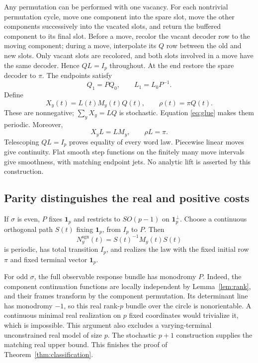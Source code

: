 \documentclass[11pt]{article}
\theoremstyle{definition}\newtheorem{definition}[theorem]{Definition}
\theoremstyle{remark}\newtheorem{remark}[theorem]{Remark}
\newcommand{\one}{\mathbf 1}
\begin{document}
Any permutation can be performed with one vacancy. For each nontrivial permutation cycle, move one component into the spare slot, move the other components successively into the vacated slots, and return the buffered component to its final slot. Before a move, recolor the vacant decoder row to the moving component; during a move, interpolate its $Q$ row between the old and new slots. Only vacant slots are recolored, and both slots involved in a move have the same decoder. Hence $QL=I_p$ throughout. At the end restore the spare decoder to $\pi$. The endpoints satisfy
\begin{equation}\label{eq:glue}
 Q_1=PQ_0,\qquad L_1=L_0P^{-1}.
\end{equation}
Define
\begin{equation}\label{eq:lift}
 X_y(t)=L(t)M_y(t)Q(t),\qquad \rho(t)=\pi Q(t).
\end{equation}
These are nonnegative; $\sum_yX_y=LQ$ is stochastic. Equation \eqref{eq:glue} makes them periodic. Moreover,
\begin{equation}\label{eq:intertwine}
 X_yL=LM_y,\qquad \rho L=\pi.
\end{equation}
Telescoping $QL=I_p$ proves equality of every word law. Piecewise linear moves give continuity. Flat smooth step functions on the finitely many move intervals give smoothness, with matching endpoint jets. No analytic lift is asserted by this construction.

\subsection{Parity distinguishes the real and positive costs}
If $\sigma$ is even, $P$ fixes $\one_p$ and restricts to $SO(p-1)$ on $\one_p^\perp$. Choose a continuous orthogonal path $S(t)$ fixing $\one_p$, from $I_p$ to $P$. Then
\begin{equation}\label{eq:signed}
 N_y^{\mathrm{sgn}}(t)=S(t)^{-1}M_y(t)S(t)
\end{equation}
is periodic, has total transition $I_p$, and realizes the law with the fixed initial row $\pi$ and fixed terminal vector $\one_p$.

For odd $\sigma$, the full observable response bundle has monodromy $P$. Indeed, the component continuation functions are locally independent by Lemma~\ref{lem:rank}, and their frames transform by the component permutation. Its determinant line has monodromy $-1$, so this real rank-$p$ bundle over the circle is nonorientable. A continuous minimal real realization on $p$ fixed coordinates would trivialize it, which is impossible. This argument also excludes a varying-terminal unconstrained real model of size $p$. The stochastic $p+1$ construction supplies the matching real upper bound. This finishes the proof of Theorem~\ref{thm:classification}.
\end{document}
